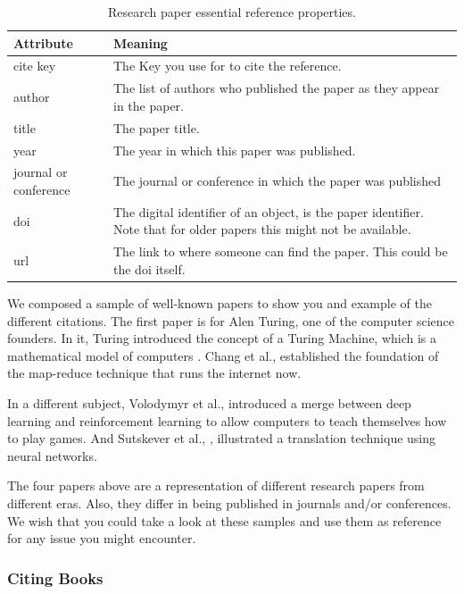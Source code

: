 \begin{table}[H]
    \centering
    \begin{tabular}{p{}p{}}
        \hline\hline
        Attribute      & Meaning \\ \hline\hline
        cite key  & The Key you use for to cite the reference.  \\
        author    & The list of authors who published the paper as they appear in the paper.  \\
        title & The paper title.  \\
        year & The year in which this paper was published.  \\
        journal or conference & The journal or conference in which the paper was published \\
        doi & The digital identifier of an object, is the paper identifier. Note that for older papers this might not be available. \\
        url & The link to where someone can find the paper. This could be the doi itself. \\ \hline
    \end{tabular}
    \caption{Research paper essential reference properties.}
    \label{tab:rp-properties}
\end{table}

We composed a sample of well-known papers to show you and example of the different citations. The first paper is for Alen Turing, one of the computer science founders. In it, Turing introduced the concept of a Turing Machine, which is a mathematical model of computers \cite{Turing:Computable:36}. Chang et al., \cite{Chang:Bigtable:08} established the foundation of the map-reduce technique that runs the internet now.

In a different subject, Volodymyr et al., \cite{Mnih:AtariRL:13} introduced a merge between deep learning and reinforcement learning to allow computers to teach themselves how to play games. And Sutskever et al., \cite{Sutskever:SeqToSeq:14}, illustrated a translation technique using neural networks.

The four papers above are a representation of different research papers from different eras. Also, they differ in being published in journals and/or conferences. We wish that you could take a look at these samples and use them as reference for any issue you might encounter.

\subsubsection{Citing Books}

